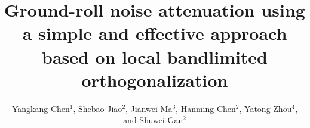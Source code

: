 
\title{Ground-roll noise attenuation using a simple and effective approach based on local bandlimited orthogonalization}
\renewcommand{\thefootnote}{\fnsymbol{footnote}}
\author{Yangkang Chen$^1$, Shebao Jiao$^2$, Jianwei Ma$^3$, Hanming Chen$^2$, Yatong Zhou$^4$, and Shuwei Gan$^2$}

\address{$^1$ Jackson School of Geosciences,
The University of Texas at Austin,
University Station, Box X,
Austin, TX 78713-8924, USA,
Email: ykchen@utexas.edu \\
$^2$ State Key Laboratory of Petroleum Resources and Prospecting, 
China University of Petroleum, 
Fuxue Road 18th,
Beijing, China, 102200, 
Email: gsw19900128@126.com \& huichanming@126.com \\
$^3$ Department of Mathematics,
Harbin Institute of Technology,
Harbin, China, 
jma@hit.edu.cn \\
$^4$ School of Electronic and Information Engineering,
Hebei University of Technology,
Xiping Road No. 5340, Beichen District,
Tianjin, China, 300401,
zyt@hebut.edu.cn 
}

\maketitle

\newcommand{\dlo}[1]{}
\newcommand{\wen}[1]{#1}    


